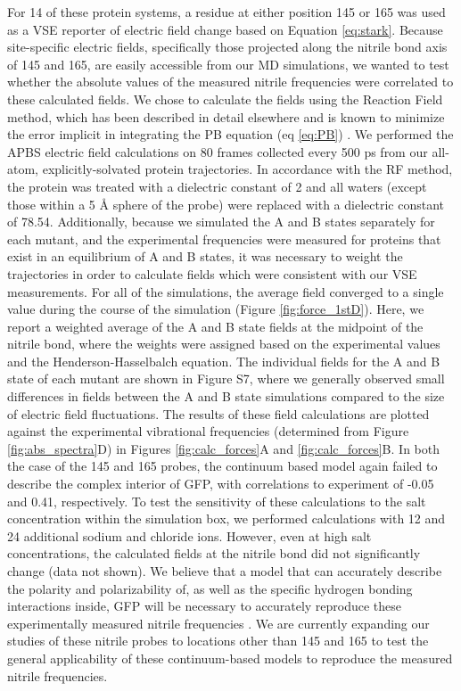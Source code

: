 For 14 of these protein systems, a \pCNF{} residue at either position 145 or 165 was used as a VSE reporter of electric field change based on Equation \ref{eq:stark}.
Because site-specific electric fields, specifically those projected along the nitrile bond axis of \pCNF{} 145 and 165, are easily accessible from our MD simulations, we wanted to test whether the absolute values of the measured nitrile frequencies were correlated to these calculated fields.
We chose to calculate the fields using the Reaction Field method, which has been described in detail elsewhere and is known to minimize the error implicit in integrating the PB equation (eq \ref{eq:PB}) \cite{Ritchie2015}.
We performed the APBS electric field calculations on 80 frames collected every 500 ps from our all-atom, explicitly-solvated protein trajectories.
In accordance with the RF method, the protein was treated with a dielectric constant of 2 and all waters (except those within a 5 \si{\angstrom} sphere of the \pCNF{} probe) were replaced with a dielectric constant of 78.54.
Additionally, because we simulated the A and B states separately for each mutant, and the experimental frequencies were measured for proteins that exist in an equilibrium of A and B states, it was necessary to weight the trajectories in order to calculate fields which were consistent with our VSE measurements.
For all of the simulations, the average field converged to a single value during the course of the simulation (Figure \ref{fig:force_1stD}).
Here, we report a weighted average of the A and B state fields at the midpoint of the nitrile bond, where the weights were assigned based on the experimental \pKa{} values and the Henderson-Hasselbalch equation.
The individual fields for the A and B state of each mutant are shown in Figure S7, where we generally observed small differences in fields between the A and B state simulations compared to the size of electric field fluctuations.
The results of these field calculations are plotted against the experimental vibrational frequencies (determined from Figure \ref{fig:abs_spectra}D) in Figures \ref{fig:calc_forces}A and \ref{fig:calc_forces}B.
In both the case of the \pCNF{} 145 and 165 probes, the continuum based model again failed to describe the complex interior of GFP, with correlations to experiment of -0.05 and 0.41, respectively.
To test the sensitivity of these calculations to the salt concentration within the simulation box, we performed calculations with 12 and 24 additional sodium and chloride ions.
However, even at high salt concentrations, the calculated fields at the nitrile bond did not significantly change (data not shown).
We believe that a model that can accurately describe the polarity and polarizability of, as well as the specific hydrogen bonding interactions inside, GFP will be necessary to accurately reproduce these experimentally measured nitrile frequencies \cite{Blasiak2016}.
We are currently expanding our studies of these nitrile probes to locations other than 145 and 165 to test the general applicability of these continuum-based models to reproduce the measured nitrile frequencies.

